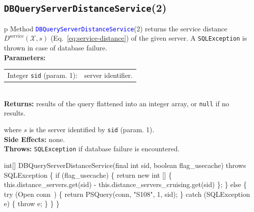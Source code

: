 \subsection{\texttt{DBQueryServerDistanceService}(2)}
\begin{tabular}{p{\textwidth}}
\toprule
{}
Method \textcolor{blue}{{\tt{}\protect{}DBQueryServerDistanceService}}(2) returns the
service distance $D^\textrm{service}(\mathcal{X},s)$
(Eq.~\ref{eq:service-distance}) of the given server.
A {\tt{}SQLException} is thrown in case of database failure.\\
\midrule
\textbf{Parameters:}\\
\begin{tabular}{lp{116mm}}
Integer {\tt{}sid} (param. 1):&server identifier.
\end{tabular}\\
\textbf{Returns:} results of the query flattened into an integer array,
or {\tt{}null} if no results.


where $s$ is the server identified by {\tt{}sid} (param. 1).\\
\textbf{Side Effects:} none.\\
\textbf{Throws:} {\tt{}SQLException} if database failure is encountered.\\
\bottomrule
\end{tabular}
\nwenddocs{}\endmoddef{}
int[] DBQueryServerDistanceService(final int sid, boolean flag_usecache) throws SQLException \{
  if (flag_usecache) \{
    return new int [] \{ this.distance_servers.get(sid) - this.distance_servers_cruising.get(sid) \};
  \} else \{
    try (\LA{}Open \code{}conn\edoc{}~{\nwtagstyle{}}\RA{}) \{
      return PSQuery(conn, "S108", 1, sid);
    \} catch (SQLException e) \{
      throw e;
    \}
  \}
\}
\eatline
{}\nwendcode{}\nwdocspar
